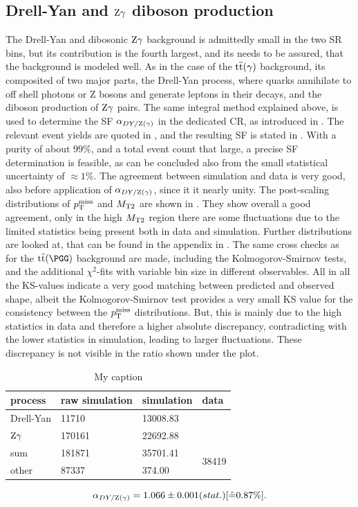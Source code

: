 \subsection{Drell-Yan and $\mathrm{Z}\gamma$ diboson production}
The Drell-Yan and dibosonic $\mathrm{Z}\gamma$ background is admittedly small in the two SR bins, but its contribution is the fourth largest, and its needs to be assured, that the background is modeled well. As in the case of the ${\mathrm{t}\overline{\mathrm{t}}}(\gamma)$ background, its composited of two major parts, the Drell-Yan process, where quarks annihilate to off shell photons or Z bosons and generate leptons in their decays, and the diboson production of $\mathrm{Z}\gamma$ pairs. The same integral method explained above, is used to determine the SF $\alpha_{DY/\mathrm{Z}(\gamma)}$ in the dedicated CR, as introduced in . The relevant event yields are quoted in , and the resulting SF is stated in . With a purity of about $99\%$, and a total event count that large, a precise SF determination is feasible, as can be concluded also from the small statistical uncertainty of $\approx1\%$. The agreement between simulation and data is very good, also before application of $\alpha_{DY/\mathrm{Z}(\gamma)}$, since it it nearly unity. The post-scaling distributions of $p_{\mathrm{T}}^\text{miss}$ and $M_{\mathrm{T2}}$ are shown in . They show overall a good agreement, only in the high $M_{\mathrm{T2}}$ region there are some fluctuations due to the limited statistics being present both in data and simulation. Further distributions are looked at, that can be found in the appendix in . The same cross checks as for the $\ttbar(\PGG)$ background are made, including the Kolmogorov-Smirnov tests, and the additional $\chi^2$-fits with variable bin size in different observables.
All in all the KS-values indicate a very good matching between predicted and observed shape, albeit the Kolmogorov-Smirnov test provides a very small KS value for the consistency between the $p_{\mathrm{T}}^\text{miss}$ distributions. But, this is mainly due to the high statistics in data and therefore a higher absolute discrepancy, contradicting with the lower statistics in simulation, leading to larger fluctuations. These discrepancy is not visible in the ratio shown under the plot.\\
\begin{table}[tbp]
 \centering
 \caption{My caption}
 \label{tab:CRDY}
 \begin{tabular}{llll}
  
  process   & raw simulation & simulation & data                   \\\hline
  Drell-Yan & 11710          & 13008.83   &                        \\
  $\mathrm{Z}\gamma$ & 170161         & 22692.88   &                        \\\hline\hline
  sum       & 181871         & 35701.41   & \multirow{2}{*}{38419} \\
  other     & 87337          & 374.00     &                        
 \end{tabular}
\end{table}
\begin{equation}\label{eq:AlphaDY}
 \alpha_{DY/\mathrm{Z}(\gamma)}=1.066 \pm 0.001 (stat.) [\hat{=}0.87\%].
\end{equation}

